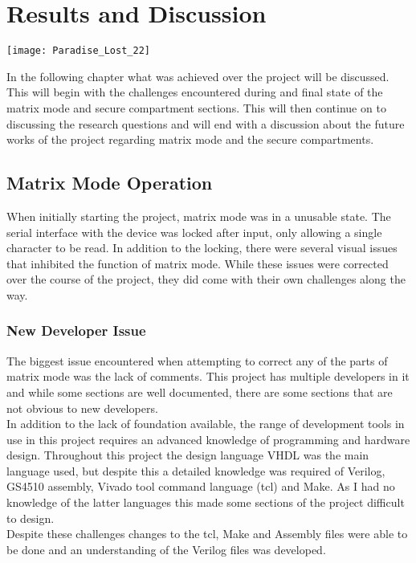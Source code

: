 
\chapter{Results and Discussion} %

\texttt{[image: Paradise\_Lost\_22]}

\label{Chapter 7} %

In the following chapter what was achieved over the project will be discussed. This will begin with the challenges encountered during and final state of the matrix mode and secure compartment sections. This will then continue on to discussing the research questions and will end with a discussion about the future works of the project regarding matrix mode and the secure compartments.


\section{Matrix Mode Operation}

\label{Ch7 Sec1}

When initially starting the project, matrix mode was in a unusable state. The serial interface with the device was locked after input, only allowing a single character to be read. In addition to the locking, there were several visual issues that inhibited the function of matrix mode. While these issues were corrected over the course of the project, they did come with their own challenges along the way. 

\subsection{New Developer Issue}

\label{Ch7 Sec1 Sub1}

The biggest issue encountered when attempting to correct any of the parts of matrix mode was the lack of comments. This project has multiple developers in it and while some sections are well documented, there are some sections that are not obvious to new developers.\\
In addition to the lack of foundation available, the range of development tools in use in this project requires an advanced knowledge of programming and hardware design. Throughout this project the design language VHDL was the main language used, but despite this a detailed knowledge was required of Verilog, GS4510 assembly, Vivado tool command language (tcl) and Make. As I had no knowledge of the latter languages this made some sections of the project difficult to design.\\
Despite these challenges changes to the tcl, Make and Assembly files were able to be done and an understanding of the Verilog files was developed.

